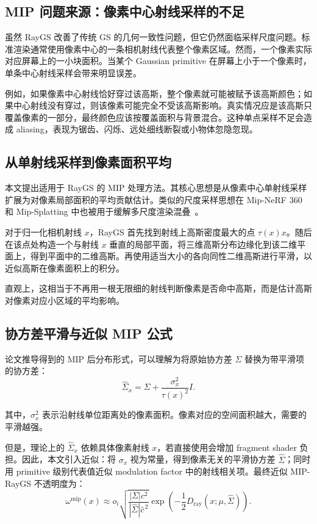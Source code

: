 \documentclass[12pt,hyperref,a4paper,UTF8]{ctexart}
\begin{document}
\subsection{MIP 问题来源：像素中心射线采样的不足}
虽然 RayGS 改善了传统 GS 的几何一致性问题，但它仍然面临采样尺度问题。标准渲染通常使用像素中心的一条相机射线代表整个像素区域。然而，一个像素实际对应屏幕上的一小块面积。当某个 Gaussian primitive 在屏幕上小于一个像素时，单条中心射线采样会带来明显误差。

例如，如果像素中心射线恰好穿过该高斯，整个像素就可能被赋予该高斯颜色；如果中心射线没有穿过，则该像素可能完全不受该高斯影响。真实情况应是该高斯只覆盖像素的一部分，最终颜色应该按覆盖面积与背景混合。这种单点采样不足会造成 aliasing，表现为锯齿、闪烁、远处细线断裂或小物体忽隐忽现。



\subsection{从单射线采样到像素面积平均}
本文提出适用于 RayGS 的 MIP 处理方法。其核心思想是从像素中心单射线采样扩展为对像素局部面积的平均贡献估计。类似的尺度采样思想在 Mip-NeRF 360 和 Mip-Splatting 中也被用于缓解多尺度渲染混叠~\cite{mipnerf360,mipsplatting}。

对于归一化相机射线 $x$，RayGS 首先找到射线上高斯密度最大的点 $\tau(x)x$。随后在该点处构造一个与射线 $x$ 垂直的局部平面，将三维高斯分布边缘化到该二维平面上，得到平面中的二维高斯。再使用适当大小的各向同性二维高斯进行平滑，以近似高斯在像素面积上的积分。

直观上，这相当于不再用一根无限细的射线判断像素是否命中高斯，而是估计高斯对像素对应小区域的平均影响。



\subsection{协方差平滑与近似 MIP 公式}
论文推导得到的 MIP 后分布形式，可以理解为将原始协方差 $\Sigma$ 替换为带平滑项的协方差：
\begin{equation}
\displaystyle
\hat{\Sigma}_{x}
=
\Sigma
+
\frac{\sigma_x^2}{\tau(x)^2}I .
\end{equation}

其中，$\sigma_x^2$ 表示沿射线单位距离处的像素面积。像素对应的空间面积越大，需要的平滑越强。

但是，理论上的 $\hat{\Sigma}_x$ 依赖具体像素射线 $x$，若直接使用会增加 fragment shader 负担。因此，本文引入近似：将 $\sigma_x$ 视为常量，得到像素无关的平滑协方差 $\hat{\Sigma}$；同时用 primitive 级别代表值近似 modulation factor 中的射线相关项。最终近似 MIP-RayGS 不透明度为：
\begin{equation}
\displaystyle
\omega^{\mathrm{mip}}(x)
\approx
o_i
\sqrt{
\frac{|\Sigma|c^2}
{|\hat{\Sigma}|\hat{c}^{\,2}}
}
\exp\!\left(
-\frac{1}{2}
D_{\mathrm{ray}}(x;\mu,\hat{\Sigma})
\right).
\end{equation}
\end{document}

